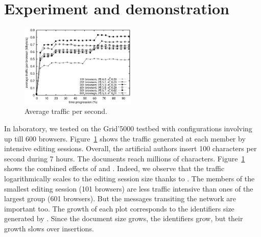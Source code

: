 
\section{Experiment and demonstration}
\label{sec:live}

\begin{figure}
  \centering
  \includegraphics[width=0.49\textwidth]{img/traffic.eps}
  \caption{\label{fig:traffic}Average traffic per second.}
\end{figure}

In laboratory, we tested \CRATE on the Grid'5000 testbed with configurations
involving up till 600 browsers. Figure~\ref{fig:traffic} shows the traffic
generated at each member by intensive editing sessions. Overall, the artificial
authors insert 100 characters per second during 7 hours. The documents reach
millions of characters. Figure~\ref{fig:traffic} shows the combined effects of
\SPRAY and \LSEQ. Indeed, we observe that the traffic logarithmically scales to
the editing session size thanks to \SPRAY. The members of the smallest editing
session (101 browsers) are less traffic intensive than ones of the largest group
(601 browsers).  But the messages transiting the network are important too. The
growth of each plot corresponds to the identifiers size generated by
\LSEQ. Since the document size grows, the identifiers grow, but their growth
slows over insertions.




